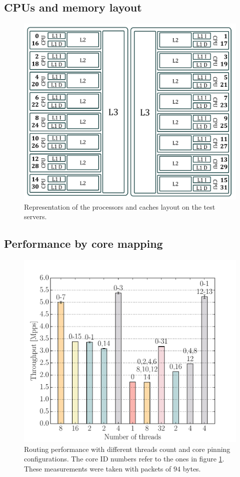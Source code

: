 \documentclass[11pt,a4paper,twoside,titlepage,openany]{book}
\begin{document}
\subsection{CPUs and memory layout}\label{sec:test.multicore.layout}
\begin{figure}[htb]
  \begin{center}
    \includegraphics[width=.7\textwidth]{img/cpus_horiz.pdf}
    \caption[Processors and caches layout on the test servers]{Representation of the processors and caches layout on the test servers.}
    \label{fig:test.multicore.cpus}
  \end{center}
\end{figure}

\todo[inline]{}

\subsection{Performance by core mapping}\label{sec:test.multicore.performance}
\begin{figure}[htb]
  \begin{center}
    \includegraphics[width=.75\textwidth]{img/augustus_multithread.pdf}
    \caption[Routing performance with different threads count and core pinning]{Routing performance with different threads count and core pinning configurations. The core ID numbers refer to the ones in figure \ref{fig:test.multicore.cpus}. These measurements were taken with packets of $94$ bytes.}
    \label{fig:test.multicore.coremap}
  \end{center}
\end{figure}
\end{document}
